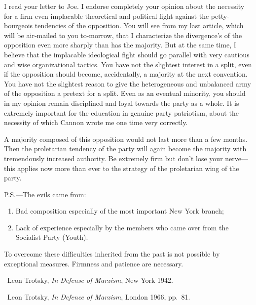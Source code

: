 \label{1939-12-18_a-letter-to-john-g-wright}


I read your letter to Joe. I endorse completely your opinion about the necessity for a firm even implacable theoretical and political fight against the petty-bourgeois tendencies of the opposition. You will see from my last article, which will be air-mailed to you to-morrow, that I characterize the divergence’s of the opposition even more sharply than has the majority. But at the same time, I believe that the implacable ideological fight should go parallel with very cautious and wise organizational tactics. You have not the slightest interest in a split, even if the opposition should become, accidentally, a majority at the next convention. You have not the slightest reason to give the heterogeneous and unbalanced army of the opposition a pretext for a split. Even as an eventual minority, you should in my opinion remain disciplined and loyal towards the party as a whole. It is extremely important for the education in genuine party patriotism, about the necessity of which Cannon wrote me one time very correctly.

A majority composed of this opposition would not last more than a few months. Then the proletarian tendency of the party will again become the majority with tremendously increased authority. Be extremely firm but don’t lose your nerve---this applies now more than ever to the strategy of the proletarian wing of the party.


\begin{postscriptum}
  P.S.---The evils came from:
  \begin{enumerate}
    \item Bad composition especially of the most important New York branch;
    \item Lack of experience especially by the members who came over from the Socialist Party (Youth).
  \end{enumerate}
  To overcome these difficulties inherited from the past is not possible by exceptional measures. Firmness and patience are necessary.
\end{postscriptum}

\begin{letterinfo}
	\firstpublished\ Leon Trotsky, \emph{In Defense of Marxism}, New York 1942.
	
	\checkedagainst\ Leon Trotsky, \emph{In Defence of Marxism}, London 1966, pp.~81.
\end{letterinfo}
